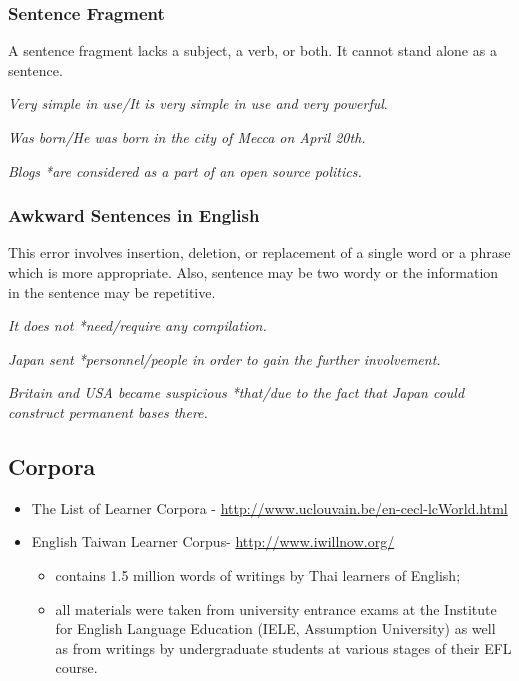 \documentclass[12pt]{article}
\begin{document}
{%

\subsubsection{Sentence Fragment}
A sentence fragment lacks a subject, a verb, or both. It cannot stand alone as a sentence. 


{\it *Very simple in use/It is very simple in use and very powerful}.

{\it *Was born/He was born in the city of Mecca on April 20th.}

{\it Blogs *are considered as a part of an open source politics.}


\subsubsection{Awkward Sentences in English}
This error involves insertion, deletion, or replacement of a single word or a phrase which is more appropriate. Also, sentence may be two wordy or the information in the sentence may be repetitive.

{\it It does not *need/require any compilation.}

{\it Japan sent *personnel/people in order to gain the further involvement.}

{\it Britain and USA became suspicious *that/due to the fact that Japan could construct permanent bases there.}

\subsection{Corpora}
\begin{itemize}[-]
\item The List of Learner Corpora - \url{http://www.uclouvain.be/en-cecl-lcWorld.html}

\item English Taiwan Learner Corpus- \url{http://www.iwillnow.org/}
\begin{itemize}
\item contains 1.5 million words of writings by Thai learners of English;
\item all materials were taken from university entrance exams at the Institute for English Language Education (IELE, Assumption University) as well as from writings by undergraduate students at various stages of their EFL course.
\end{itemize}


\end{itemize}}
\end{document}
